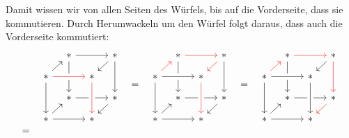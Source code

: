 \documentclass[a4paper,10pt,numbers=noenddot]{scrartcl}
\begin{document}
Damit wissen wir von allen Seiten des Würfels, bis auf die Vorderseite, dass sie kommutieren.
Durch Herumwackeln um den Würfel folgt daraus, dass auch die Vorderseite kommutiert:
\[
  \begin{array}{cccccccc}
        &
    \begin{tikzcd}[row sep = 10, column sep = 10]
        {}
      & *
        \arrow[rr]
        \arrow[dd]
      & {}
      & *
        \arrow[dl]
        \arrow[dd]
      \\
        *
        \arrow[ur]
        \arrow[rr, crossing over, red]
        \arrow[dd]
      & {}
      & *
      & {}
      \\
        {}
      & *
        \arrow[rr]
      & {}
      & *
        \arrow[dl]
      \\
        *
        \arrow[ur]
        \arrow[rr]
      & {}
      & *
        \arrow[from=uu, crossing over, red]
      & {}
    \end{tikzcd}
    & = &
   \begin{tikzcd}[row sep = 10, column sep = 10]
        {}
      & *
        \arrow[rr, red]
        \arrow[dd]
      & {}
      & *
        \arrow[dl, red]
        \arrow[dd]
      \\
        *
        \arrow[ur, red]
        \arrow[rr, crossing over]
        \arrow[dd]
      & {}
      & *
      & {}
      \\
        {}
      & *
        \arrow[rr]
      & {}
      & *
        \arrow[dl]
      \\
        *
        \arrow[ur]
        \arrow[rr]
      & {}
      & *
        \arrow[from=uu, crossing over, red]
      & {}
    \end{tikzcd}
    & = &
    \begin{tikzcd}[row sep = 10, column sep = 10]
        {}
      & *
        \arrow[rr, red]
        \arrow[dd]
      & {}
      & *
        \arrow[dl]
        \arrow[dd, red]
      \\
        *
        \arrow[ur, red]
        \arrow[rr, crossing over]
        \arrow[dd]
      & {}
      & *
      & {}
      \\
        {}
      & *
        \arrow[rr]
      & {}
      & *
        \arrow[dl, red]
      \\
        *
        \arrow[ur]
        \arrow[rr]
      & {}
      & *
        \arrow[from=uu, crossing over]
      & {}
    \end{tikzcd}
    \\
      = &
    \begin{tikzcd}[row sep = 10, column sep = 10]

\end{tikzcd}
\end{array}\]
\end{document}
